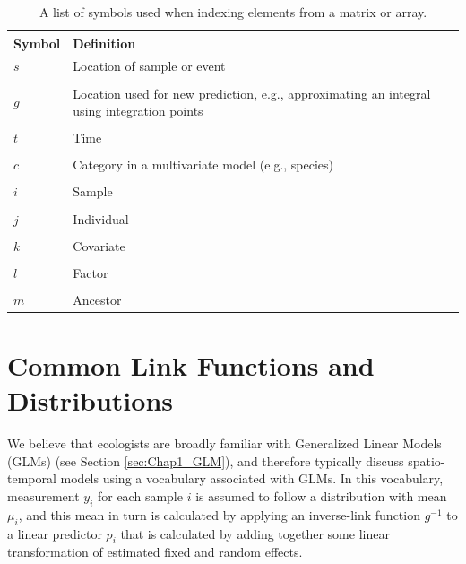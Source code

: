 \begin{table}
  \caption[Notation for commonly used indices]{A list of symbols used when indexing elements from a matrix or array.}
\begin{center}
\begin{tabularx}{\textwidth}{ | X m{4in} | } 
  \hline
  Symbol & Definition \\ 
  \hline
  \( s \) & Location of sample or event \\ & \\ 

  \( g \) & Location used for new prediction, e.g., approximating an integral using integration points \\ & \\ 

  \( t \) & Time \\ & \\

  \( c \) & Category in a multivariate model (e.g., species) \\ & \\

  \( i \) & Sample \\ & \\

  \( j \) & Individual \\ & \\

  \( k \) & Covariate \\ & \\

  \( l \) & Factor \\ & \\

  \( m \) & Ancestor \\ 
\hline
\end{tabularx}
  \label{tab:Appendix_indices}
\end{center}
\end{table}

\section{Common Link Functions and Distributions} \label{sec:Appendix_links_and_distributions}

We believe that ecologists are broadly familiar with Generalized Linear Models (GLMs) (see Section \ref{sec:Chap1_GLM}), and therefore typically discuss spatio-temporal models using a vocabulary associated with GLMs. In this vocabulary, measurement \(y_i\) for each sample \(i\) is assumed to follow a distribution with mean \(\mu_i\), and this mean in turn is calculated by applying an inverse-link function \(g^{-1}\) to a linear predictor \(p_i\) that is calculated by adding together some linear transformation of estimated fixed and random effects.   

